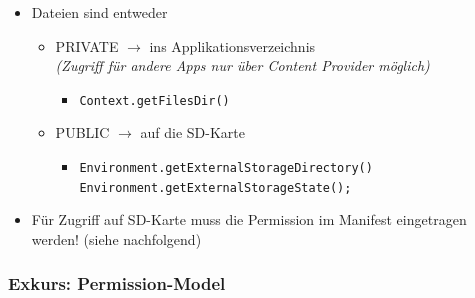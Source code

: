\documentclass[a4paper]{article}
\begin{document}
\begin{itemize}
	\item Dateien sind entweder
	\begin{itemize}
		\item PRIVATE $\rightarrow$ ins Applikationsverzeichnis\\
		\textit{(Zugriff für andere Apps nur über Content Provider möglich)}
		\begin{itemize}
			\item \texttt{Context.getFilesDir()}
		\end{itemize}
		\item PUBLIC $\rightarrow$ auf die SD-Karte 
		\begin{itemize}
			\item \texttt{Environment.getExternalStorageDirectory()}\\
			\texttt{Environment.getExternalStorageState();}
		\end{itemize}
	\end{itemize}
	\item Für Zugriff auf SD-Karte muss die Permission im Manifest eingetragen werden! (siehe nachfolgend)
\end{itemize}
	
\subsubsection{Exkurs: Permission-Model}
\end{document}

